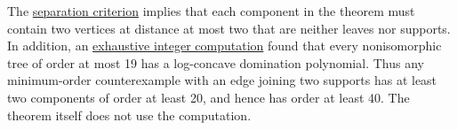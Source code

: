 \documentclass[10pt]{article}
\begin{document}
The \href{https://github.com/claude-make-no-mistakes/tree-domination-counterexample-search/blob/main/paper.pdf}{separation criterion} implies that each component in the theorem must contain two vertices at distance at most two that are neither leaves nor supports. In addition, an \href{https://github.com/claude-make-no-mistakes/tree-domination-counterexample-search/blob/main/catalogue.jsonl}{exhaustive integer computation} found that every nonisomorphic tree of order at most 19 has a log-concave domination polynomial. Thus any minimum-order counterexample with an edge joining two supports has at least two components of order at least 20, and hence has order at least 40. The theorem itself does not use the computation.
\end{document}
